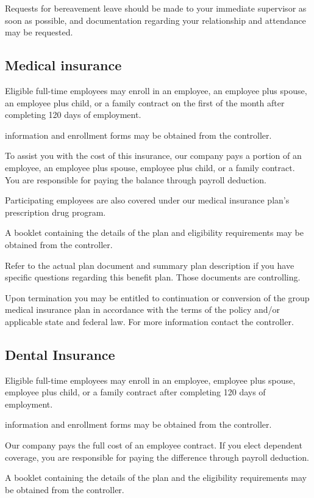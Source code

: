 Requests for bereavement leave should be made to your immediate supervisor as soon as possible, and documentation regarding your relationship and attendance may be requested.

\subsection{Medical insurance}

Eligible full-time employees may enroll in an employee, an employee plus spouse, an employee plus child, or a family contract on the first of the month after completing 120 days of employment.

information and enrollment forms may be obtained from the controller.

To assist you with the cost of this insurance, our company pays a portion of an employee, an employee plus spouse, employee plus child, or a family contract. You are responsible for paying the balance through payroll deduction.

Participating employees are also covered under our medical insurance plan's prescription drug program.

A booklet containing the details of the plan and eligibility requirements may be obtained from the controller.

Refer to the actual plan document and summary plan description if you have specific questions regarding this benefit plan. Those documents are controlling.

Upon termination you may be entitled to continuation or conversion of the group medical insurance plan in accordance with the terms of the policy and/or applicable state and federal law. For more information contact the controller.

\subsection{Dental Insurance}

Eligible full-time employees may enroll in an employee, employee plus spouse, employee plus child, or a family contract after completing 120 days of employment.

information and enrollment forms may be obtained from the controller.

Our company pays the full cost of an employee contract. If you elect dependent coverage, you are responsible for paying the difference through payroll deduction.

A booklet containing the details of the plan and the eligibility requirements may be obtained from the controller.

